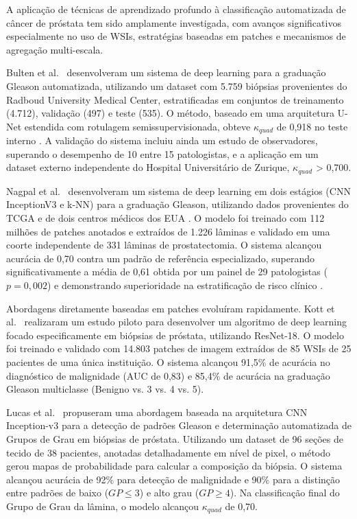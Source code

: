A aplicação de técnicas de aprendizado profundo à classificação automatizada de câncer de próstata tem sido amplamente investigada, com avanços significativos especialmente no uso de WSIs, estratégias baseadas em patches e mecanismos de agregação multi-escala. 

Bulten et al.~\cite{ref-bulten2020} desenvolveram um sistema de deep learning para a graduação Gleason automatizada, utilizando um dataset com 5.759 biópsias provenientes do Radboud University Medical Center, estratificadas em conjuntos de treinamento (4.712), validação (497) e teste (535). O método, baseado em uma arquitetura U-Net estendida com rotulagem semissupervisionada, obteve $\kappa_{quad}$ de 0,918 no teste interno . A validação do sistema incluiu ainda um estudo de observadores, superando o desempenho de 10 entre 15 patologistas, e a aplicação em um dataset externo independente do Hospital Universitário de Zurique, $\kappa_{quad}$ > 0,700.

Nagpal et al.~\cite{ref-nagpal2019} desenvolveram um sistema de deep learning em dois estágios (CNN InceptionV3 e k-NN) para a graduação Gleason, utilizando dados provenientes do TCGA e de dois centros médicos dos EUA . O modelo foi treinado com 112 milhões de patches anotados e extraídos de 1.226 lâminas e validado em uma coorte independente de 331 lâminas de prostatectomia. O sistema alcançou acurácia de 0,70 contra um padrão de referência especializado, superando significativamente a média de 0,61 obtida por um painel de 29 patologistas ($p=0,002$) e demonstrando superioridade na estratificação de risco clínico .

Abordagens diretamente baseadas em patches evoluíram rapidamente.
Kott et al.~\cite{ref-kott2019} realizaram um estudo piloto para desenvolver um algoritmo de deep learning focado especificamente em biópsias de próstata, utilizando ResNet-18. O modelo foi treinado e validado com 14.803 patches de imagem extraídos de 85 WSIs de 25 pacientes de uma única instituição. O sistema alcançou 91,5\% de acurácia no diagnóstico de malignidade (AUC de 0,83) e 85,4\% de acurácia na graduação Gleason multiclasse (Benigno vs. 3 vs. 4 vs. 5).

Lucas et al.~\cite{ref-lucas2019}  propuseram uma abordagem baseada na arquitetura CNN Inception-v3 para a detecção de padrões Gleason e determinação automatizada de Grupos de Grau em biópsias de próstata. Utilizando um dataset de 96 seções de tecido de 38 pacientes, anotadas detalhadamente em nível de pixel, o método gerou mapas de probabilidade para calcular a composição da biópsia. O sistema alcançou acurácia de 92\% para detecção de malignidade e 90\% para a distinção entre padrões de baixo ($GP \le 3$) e alto grau ($GP \ge 4$). Na classificação final do Grupo de Grau da lâmina, o modelo alcançou 
$\kappa_{quad}$ de 0,70.


